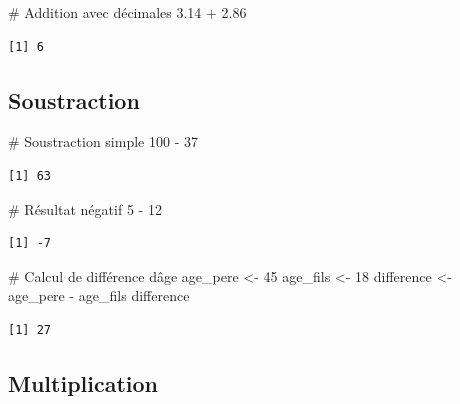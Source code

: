\documentclass[
  french,
  11pt,
  a4paper,
]{article}
\newenvironment{Shaded}{}{}
\newcommand{\CommentTok}[1]{\textcolor[rgb]{0.42,0.45,0.49}{#1}}
\newcommand{\DecValTok}[1]{\textcolor[rgb]{0.00,0.36,0.77}{#1}}
\newcommand{\FloatTok}[1]{\textcolor[rgb]{0.00,0.36,0.77}{#1}}
\newcommand{\NormalTok}[1]{\textcolor[rgb]{0.14,0.16,0.18}{#1}}
\newcommand{\OtherTok}[1]{\textcolor[rgb]{0.44,0.26,0.76}{#1}}
\newcommand{\SpecialCharTok}[1]{\textcolor[rgb]{0.00,0.36,0.77}{#1}}
\begin{document}
\begin{Shaded}
\begin{Highlighting}[]
\CommentTok{\# Addition avec décimales}
\FloatTok{3.14} \SpecialCharTok{+} \FloatTok{2.86}
\end{Highlighting}
\end{Shaded}

\begin{verbatim}
[1] 6
\end{verbatim}

\subsection{Soustraction}\label{soustraction}

\begin{Shaded}
\begin{Highlighting}[]
\CommentTok{\# Soustraction simple}
\DecValTok{100} \SpecialCharTok{{-}} \DecValTok{37}
\end{Highlighting}
\end{Shaded}

\begin{verbatim}
[1] 63
\end{verbatim}

\begin{Shaded}
\begin{Highlighting}[]
\CommentTok{\# Résultat négatif}
\DecValTok{5} \SpecialCharTok{{-}} \DecValTok{12}
\end{Highlighting}
\end{Shaded}

\begin{verbatim}
[1] -7
\end{verbatim}

\begin{Shaded}
\begin{Highlighting}[]
\CommentTok{\# Calcul de différence d\textquotesingle{}âge}
\NormalTok{age\_pere }\OtherTok{\textless{}{-}} \DecValTok{45}
\NormalTok{age\_fils }\OtherTok{\textless{}{-}} \DecValTok{18}
\NormalTok{difference }\OtherTok{\textless{}{-}}\NormalTok{ age\_pere }\SpecialCharTok{{-}}\NormalTok{ age\_fils}
\NormalTok{difference}
\end{Highlighting}
\end{Shaded}

\begin{verbatim}
[1] 27
\end{verbatim}

\subsection{Multiplication}\label{multiplication}
\end{document}
